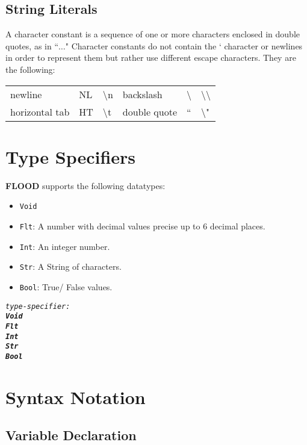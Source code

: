 \documentclass[12pt]{report}
\begin{document}
\subsection{String Literals}

A character constant is a sequence of one or more characters enclosed in double quotes, as in ``$\ldots$" Character constants do not contain the ` character or newlines in order to represent them but rather use different escape characters. They are the following:

\begin{center}
\begin{tabular}{ l l l l l l }
newline & NL & \textbackslash{n} & backslash & \textbackslash & \textbackslash\textbackslash \\
horizontal tab & HT & \textbackslash{t} & double quote & `` & \textbackslash"
\end{tabular}
\end{center}

\section{Type Specifiers}

\textbf{FLOOD} supports the following datatypes:
\begin{itemize}
\item \texttt{Void}
\item \texttt{Flt}: A number with decimal values precise up to 6 decimal places.
\item \texttt{Int}: An integer number.
\item \texttt{Str}: A String of characters.
\item \texttt{Bool}: True/ False values.
\end{itemize}
\begin{alltt}\begin{singlespace}
         \textit{type-specifier:}
              \textit{\textbf{Void}}
              \textit{\textbf{Flt}}
              \textit{\textbf{Int}}
              \textit{\textbf{Str}}
              \textit{\textbf{Bool}}\end{singlespace}
\end{alltt}

\section{Syntax Notation}

\subsection{Variable Declaration}
\end{document}
